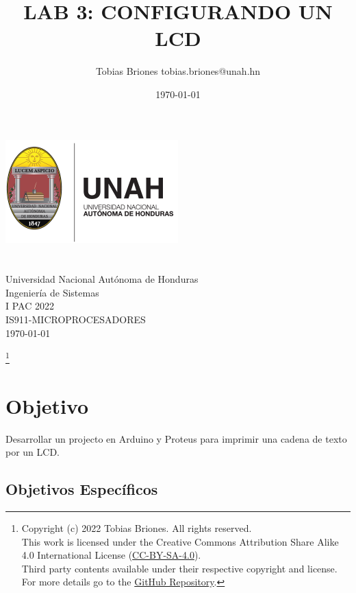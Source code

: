\documentclass{article}
\title{LAB 3: CONFIGURANDO UN LCD}
\author{Tobias Briones \bigbreak tobias.briones@unah.hn}
\date{\today}
\newcommand\blfootnote[1]{
    \begingroup
    \renewcommand\thefootnote{}\footnote{#1}
    \addtocounter{footnote}{-1}
    \endgroup
}
\begin{document}
    \makeatletter
    \begin{titlepage}
        \begin{center}
            \includegraphics[width=0.3\linewidth]{images/logo-unah.png}\\[4ex]
            {\huge \bfseries \@title
            \vspace{1cm}}\\[2ex]
            {\LARGE \@author}\\[50ex]

            {\large
            Universidad Nacional Autónoma de Honduras\\
            Ingeniería de Sistemas\\
            I PAC 2022\\
            IS911-MICROPROCESADORES
            }\\[2ex]

            {\large \today}
        \end{center}
    \end{titlepage}
    \makeatother
    \thispagestyle{empty}
    \newpage

    \blfootnote{
        Copyright (c) 2022 Tobias Briones. All rights reserved. \\
        This work is licensed under the Creative Commons Attribution Share Alike 4.0 International License (\href{https://spdx.org/licenses/CC-BY-SA-4.0}{CC-BY-SA-4.0}). \\
        Third party contents available under their respective copyright and license.\\
        For more details go to the \href{https://github.com/tobiasbriones/cp-unah-is911-microprocessors}{GitHub Repository}.}

    \section{Objetivo}

    Desarrollar un projecto en Arduino y Proteus para imprimir una cadena de texto por un LCD.

    \subsection{Objetivos Específicos}
\end{document}
